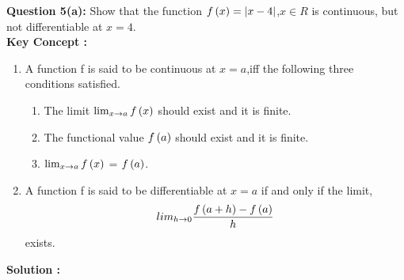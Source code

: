 \documentclass[journal,12pt,twocolumn]{IEEEtran}
\begin{document}
 \textbf{ Question 5(a):}
   Show that the function $ f\left(x\right) = |x-4| $,$x \in R$ is continuous, but not differentiable at $ x = 4 $.\\
 \textbf{ Key Concept : }
  \begin{enumerate}
      \item  A function f is said to be continuous at $x = a$,iff the following three conditions satisfied. 
            \begin{enumerate}[label=\roman*]
                \item The limit $\lim_{x \to a}f\left(x\right)$ should exist and it is finite.
                \item The functional value $f\left(a\right)$ should exist and it is finite.
                \item $\lim_{x \to a}f\left(x\right)$ = $f\left(a\right)$.
            \end{enumerate}
      \item  A function f is said to be differentiable at $x=a$ if and only if the limit,
           \[
               lim_{h \to 0}\frac{f\left(a + h\right) - f\left(a\right)}{h}
           \]  exists.
                 
  \end{enumerate}
 \textbf{ Solution :}
\end{document}
